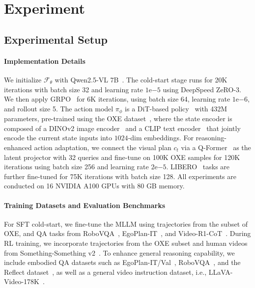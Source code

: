 \section{Experiment}
\label{sec:experiments}

\subsection{Experimental Setup}
\label{ssec:exp_setup}

\paragraph{Implementation Details}

We initialize $\mathcal{F}_\theta$ with Qwen2.5-VL 7B~\cite{bai2025qwen2}. The cold-start stage runs for 20K iterations with batch size 32 and learning rate $1\text{e}{-5}$ using DeepSpeed ZeRO-3. We then apply GRPO~\cite{shao2024deepseekmath} for 6K iterations, using batch size 64, learning rate $1\text{e}{-6}$, and rollout size 5. The action model $\pi_\phi$ is a DiT-based policy~\cite{chi2023diffusion} with 432M parameters, pre-trained using the OXE dataset~\cite{o2024open}, where the state encoder is composed of a DINOv2 image encoder~\cite{oquab2023dinov2} and a CLIP text encoder~\cite{radford2021learning} that jointly encode the current state inputs into $1024$-dim embeddings. For reasoning-enhanced action adaptation, we connect the visual plan $c_t$ via a Q-Former~\cite{li2023blip} as the latent projector with 32 queries and fine-tune on 100K OXE samples for 120K iterations using batch size 256 and learning rate $2\text{e}{-5}$. LIBERO~\cite{liu2023libero} tasks are further fine-tuned for 75K iterations with batch size 128. All experiments are conducted on 16 NVIDIA A100 GPUs with 80 GB memory.

\paragraph{Training Datasets and Evaluation Benchmarks}

For SFT cold-start, we fine-tune the MLLM using trajectories from the subset of OXE, and QA tasks from RoboVQA~\cite{sermanet2024robovqa}, EgoPlan-IT~\cite{chen2023egoplan}, and Video-R1-CoT~\cite{feng2025video}. During RL training, we incorporate trajectories from the OXE subset and human videos from Something-Something v2~\cite{goyal2017something}. To enhance general reasoning capability, we include embodied QA datasets such as EgoPlan-IT/Val~\cite{chen2023egoplan}, RoboVQA~\cite{sermanet2024robovqa}, and the Reflect dataset~\cite{liu2023reflect}, as well as a general video instruction dataset, i.e., LLaVA-Video-178K~\cite{zhang2024video}.

